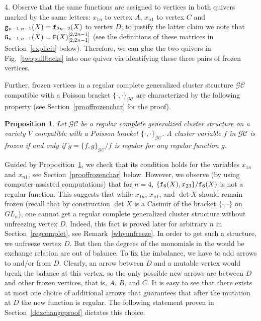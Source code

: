 \documentclass{amsart}
\newtheorem{proposition}[theorem]{Proposition}
\theoremstyle{definition}
\theoremstyle{remark}
\numberwithin{equation}{section}
\numberwithin{theorem}{section}
\def\CC{{\mathcal C}}
\def\G{{\mathcal G}}
\def\NF{{\tt F}}
\def\NG{{\tt G}}
\def\ef{{\tt f}}
\def\eg{{\tt g}}
\def\Poi{{\{{\cdot},{\cdot}\}}}
\begin{document}
4. Observe that the same functions are assigned to vertices in both quivers marked by the same letters: 
$x_{1n}$ to vertex $A$, $x_{n1}$ to vertex $C$ and $\eg_{n-1,n-1}(X)=\ef_{2n-2}(X)$ to vertex $D$;
to justify the latter claim we note that $\NG_{n-1,n-1}(X)=\NF(X)_{[2,2n-1]}^{[2,2n-1]}$ (see the definitions of these matrices in Section~\ref{explicit} below). 
Therefore, we can glue the two quivers in Fig.~\ref{twopullbacks}
 into one quiver via identifying these three pairs of frozen vertices. 

Further, frozen vertices in a regular complete generalized cluster structure $\G\CC$ compatible with a Poisson bracket
$\Poi_{\G\CC}$ are characterized by the following property (see Section~\ref{prooffrozenchar} for the proof).

\begin{proposition}\label{frozenchar}
Let $\G\CC$ be a regular complete generalized cluster structure on a variety $V$ compatible with a Poisson bracket
$\Poi_{\G\CC}$. A cluster variable $f$ in $\G\CC$ is frozen if and only if $\tilde g=\{f,g\}_{\G\CC}/f$ is regular
for any regular function $g$.
\end{proposition}

Guided by Proposition~\ref{frozenchar}, we check that its condition holds for the variables $x_{1n}$ and $x_{n1}$, see Section~\ref{prooffrozenchar} below. However, we observe (by using computer-assisted computations) that for $n=4$, $\{\ef_6(X),x_{23}\}/\ef_6(X)$ is not a regular function.
This suggests that while $x_{1n}$, $x_{n1}$, and $\det X$ should remain frozen (recall that by construction $\det X$ is a Casimir of the bracket $\Poi$ on $GL_n$),
one cannot get a regular complete generalized cluster structure without unfreezing vertex $D$.
Indeed, this fact is proved later for arbitrary $n$ in Section~\ref{regcomplet}, see Remark~\ref{whyunfreeze}. 
In order to get such a structure, we unfreeze vertex $D$. But then the degrees of the monomials in the would be
exchange relation are out of balance. To fix the imbalance, we have to add arrows to and/or from $D$. Clearly, an arrow between $D$ and a mutable vertex would break the balance at this vertex, so the only possible new arrows are between $D$ and other frozen vertices, that is, $A$, $B$, and $C$. It is easy to see that there exists at most one choice of additional arrows that guarantees that after the mutation at $D$ the new function is regular. The following statement proven in Section~\ref{dexchangeproof} dictates this choice. 
\end{document}
